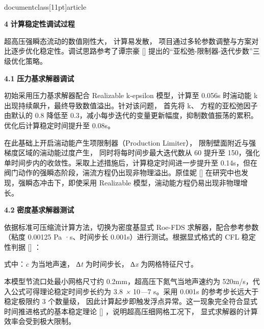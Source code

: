 \\documentclass[11pt]{article}
\begin{document}
\par
\textbf{4    }\textbf{计算稳定性调试过程}\par

超高压强瞬态流动的数值刚性大， 计算易发散， 项目通过多轮参数调整与方案对比逐步优化稳定性。调试思路参考了谭宗豪 [\cite{fe880629_9ce4_4876_a173_e24a97d827f4_基于数字孪生的管道阀门监测技术研究_谭宗豪}]  提出的“亚松弛-限制器-迭代步数”三级优化策略。\par

\par
\textbf{4.1    }\textbf{压力基求解器调试}\par

初始采用压力基求解器配合 Realizable k-epsilon 模型，计算至 0.056s 时湍动能 k出现持续飙升，最终导致数值溢出。针对该问题， 首先将 k、 方程的亚松弛因子由默认的 0.8 降低至 0.3，减小每步迭代的变量更新幅度，抑制数值振荡的累积。优化后计算稳定时间提升至 0.08s。\par

在此基础上开启湍动能产生项限制器（Production Limiter）， 限制壁面附近与强梯度区域的湍动能过度产生， 同时将每时间步最大迭代数从 60 提升至 150，强化单时间步内的收敛性。采取上述措施后，计算稳定时间进一步提升至 0.14s，但在阀门动作的强瞬态阶段，湍流方程仍出现非物理溢出。原佳妮 [\cite{fe880629_9ce4_4876_a173_e24a97d827f4_基于数字孪生的管道阀门监测技术研究_谭宗豪}]  在研究中也发现，强瞬态冲击下，即使采用 Realizable 模型，湍动能方程仍易出现非物理增长。\par

\par
\textbf{4.2    }\textbf{密度基求解器测试}\par

依据标准可压缩流计算方法，切换为密度基显式 Roe-FDS 求解器，配合参考参数（粘度 0.00125 Pa ·s、时间步长 0.001s）进行测试。根据显式格式的 CFL 稳定性判据 [\cite{fe880629_9ce4_4876_a173_e24a97d827f4_基于数字孪生的管道阀门监测技术研究_谭宗豪}] ：\par

\par
\par
式中：\textit{c}\textit{ }为当地声速， ∆\textit{t}\textit{ }为时间步长， ∆\textit{x}\textit{ }为网格特征尺寸。\par

本模型节流口处最小网格尺寸约 0.2mm，超高压下氮气当地声速约为 520m/s，代入公式可得理论稳定时间步长约为 3\textit{.}8 \textit{×}\textit{ }10\textit{—}7  s。采用 0.001s 的参考步长远大于稳定极限约 3 个数量级， 因此计算起步即触发浮点异常。这一现象完全符合显式时间推进格式的基本稳定理论 [\cite{fe880629_9ce4_4876_a173_e24a97d827f4_基于数字孪生的管道阀门监测技术研究_谭宗豪}] ，说明超高压细网格工况下， 显式求解器的计算效率会受到极大限制。\par
\end{document}
